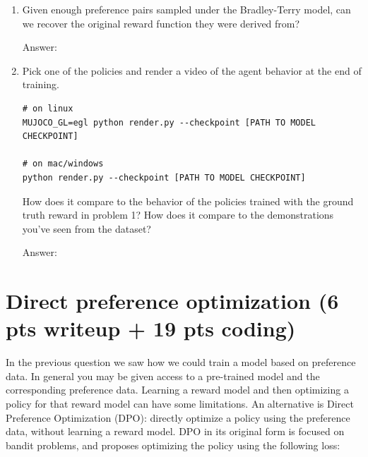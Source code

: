 \documentclass{article}
\newcommand{\answer}[1]{
    \begin{tcolorbox}[breakable]
    Answer: #1
    \end{tcolorbox}
    \clearpage
}
\begin{document}
\begin{enumerate}
{\small
\begin{tcolorbox}
\begin{verbatim}
# run rlhf
# Note: You may want to look at the original_scores.png 
# and learned_scores.png generated in the output folder
python run_rlhf.py --seed SEED

# plot 
python plot.py --rlhf-directory results_rlhf \
    --output results_rlhf/hopper_rlhf.png --seeds 1,2,3
\end{verbatim}
\end{tcolorbox}
}

Do the two correlate?
\answer{

}

\item[(f)] Given enough preference pairs sampled under the Bradley-Terry model, can we recover the original reward function they were derived from?
\answer{

}

\item[(g)] Pick one of the policies and render a video of the agent behavior at the end of training.

{\small
\begin{tcolorbox}
\begin{verbatim}
# on linux
MUJOCO_GL=egl python render.py --checkpoint [PATH TO MODEL CHECKPOINT]

# on mac/windows
python render.py --checkpoint [PATH TO MODEL CHECKPOINT]
\end{verbatim}
\end{tcolorbox}
}


How does it compare to the behavior of the policies trained with the ground truth reward in problem 1? How does it compare to the demonstrations you've seen from the dataset?
\answer{

}

\end{enumerate}

\section{Direct preference optimization (6 pts writeup + 19 pts coding)}

In the previous question we saw how we could train a model based on preference data. In general you may be given access to a pre-trained model and the corresponding preference data. Learning a reward model and then optimizing a policy for that reward model can have some limitations. An alternative is Direct Preference Optimization (DPO): directly optimize a policy using the preference data, without learning a reward model. DPO in its original form is focused on bandit problems, and proposes optimizing the policy using the following loss:
\end{document}
